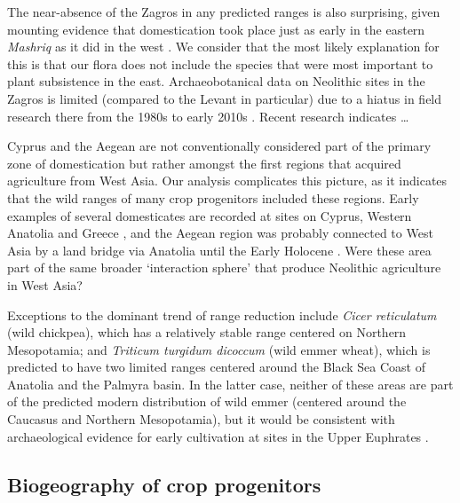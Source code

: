 \documentclass[
  authoryear,
  preprint]{elsarticle}
\begin{document}
The near-absence of the Zagros in any predicted ranges is also
surprising, given mounting evidence that domestication took place just
as early in the eastern \emph{Mashriq} as it did in the west
\citep{Braidwood, GanjDarehGoats, HillyFlanksStuff}. We consider that
the most likely explanation for this is that our flora does not include
the species that were most important to plant subsistence in the east.
Archaeobotanical data on Neolithic sites in the Zagros is limited
(compared to the Levant in particular) due to a hiatus in field research
there from the 1980s to early 2010s \citep{cite}. Recent research
\citep{Amaia} indicates \ldots{}

Cyprus and the Aegean are not conventionally considered part of the
primary zone of domestication but rather amongst the first regions that
acquired agriculture from West Asia. Our analysis complicates this
picture, as it indicates that the wild ranges of many crop progenitors
included these regions. Early examples of several domesticates are
recorded at sites on Cyprus, Western Anatolia and Greece
\citep{ArranzOtaeguiRoe2023}, and the Aegean region was probably
connected to West Asia by a land bridge via Anatolia until the Early
Holocene \citep{AksuHiscott2022}. Were these area part of the same
broader `interaction sphere' \citep{cite} that produce Neolithic
agriculture in West Asia?

Exceptions to the dominant trend of range reduction include \emph{Cicer
reticulatum} (wild chickpea), which has a relatively stable range
centered on Northern Mesopotamia; and \emph{Triticum turgidum dicoccum}
(wild emmer wheat), which is predicted to have two limited ranges
centered around the Black Sea Coast of Anatolia and the Palmyra basin.
In the latter case, neither of these areas are part of the predicted
modern distribution of wild emmer (centered around the Caucasus and
Northern Mesopotamia), but it would be consistent with archaeological
evidence for early cultivation at sites in the Upper Euphrates
\citep{Willcox2024}.

\subsection{Biogeography of crop
progenitors}\label{biogeography-of-crop-progenitors}
\end{document}

